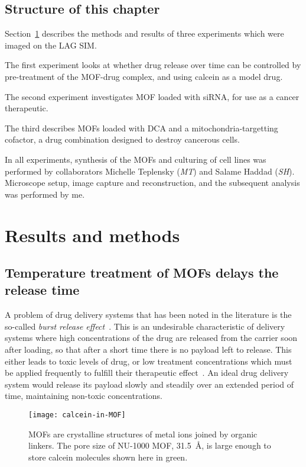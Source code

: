 \subsection{Structure of this chapter}
Section~\ref{sec:mofmethods} describes the methods and results of three experiments which were imaged on the LAG SIM. 

The first experiment looks at whether drug release over time can be controlled by pre-treatment of the MOF-drug complex, and using calcein as a model drug. 

The second experiment investigates MOF loaded with siRNA, for use as a cancer therapeutic.
 
The third describes MOFs loaded with DCA and a mitochondria-targetting cofactor, a drug combination designed to destroy cancerous cells. 

In all experiments, synthesis of the MOFs and culturing of cell lines was performed by collaborators Michelle Teplensky (\textit{MT}) and Salame Haddad (\textit{SH}). 
Microscope setup, image capture and reconstruction, and the subsequent analysis was performed by me. 

\section{Results and methods} \label{sec:mofmethods}

\subsection{Temperature treatment of MOFs delays the release time} \label{sec:mof-temperature}
A problem of drug delivery systems that has been noted in the literature is the so-called \textit{burst release effect}~\cite{huang2001importance}.
This is an undesirable characteristic of delivery systems where high concentrations of the drug are released from the carrier soon after loading, so that after a short time there is no payload left to release. 
This either leads to toxic levels of drug, or low treatment concentrations which must be applied frequently to fulfill their therapeutic effect~\cite{fu2010drug}. 
An ideal drug delivery system would release its payload slowly and steadily over an extended period of time, maintaining non-toxic concentrations. 

\begin{figure}[b!]
\centering
\texttt{[image: calcein-in-MOF]}
\caption[MOFs: The NU-1000 MOF has a large pore size to store other molecules]{MOFs are crystalline structures of metal ions joined by organic linkers. The pore size of NU-1000 MOF, \SI{31.5}{\angstrom}, is large enough to store calcein molecules shown here in green.}
\label{fig:calcein-in-MOF}
\end{figure}

